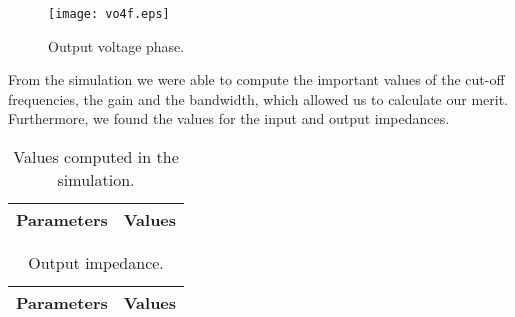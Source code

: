 \vspace{10.0cm}

\begin{figure}[h] \centering
\texttt{[image: vo4f.eps]}
\caption{Output voltage phase.}
\label{fig:s5}
\end{figure}

\vspace{10.0cm}

\par From the simulation we were able to compute the important values of the cut-off frequencies, the gain and the bandwidth, which allowed us to calculate our merit. Furthermore, we found the values for the input and output impedances.

\begin{table}[h]
  \centering
  \begin{tabular}{|l|r|}
    \hline    
    {\bf Parameters} & {\bf Values} \\ \hline
    
  \end{tabular}
  \caption{Values computed in the simulation.}
  \label{tab:s1}
\end{table}

\begin{table}[h]
  \centering
  \begin{tabular}{|l|r|}
    \hline    
    {\bf Parameters} & {\bf Values} \\ \hline
    
  \end{tabular}
  \caption{Output impedance.}
  \label{tab:s2}
\end{table}


